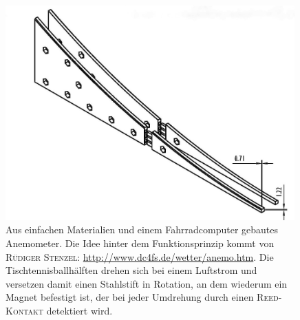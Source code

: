 \begin{figure}[htbp]
\vspace*{0.2cm}
\centering
 \includegraphics[width=0.99\textwidth]{images/rampedraw1.jpg}
  \caption[Isometrische Ansicht der Beschleunigereinheit]{Aus einfachen Materialien und einem Fahrradcomputer gebautes Anemometer. Die Idee hinter dem Funktionsprinzip kommt von \textsc{Rüdiger Stenzel}: \url{http://www.dc4fs.de/wetter/anemo.htm}. Die Tischtennisballhälften drehen sich bei einem Luftstrom und versetzen damit einen Stahlstift in Rotation, an dem wiederum ein Magnet befestigt ist, der bei jeder Umdrehung durch einen \textsc{Reed-Kontakt} detektiert wird.}
  \label{fig:isodraw}
  \vspace{-0pt}
\end{figure}
